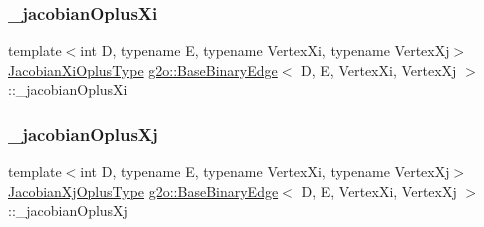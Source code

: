 \mbox{\label{classg2o_1_1_base_binary_edge_aa21b9d84924ec93192374761ee0adfa7}} 
\subsubsection{\texorpdfstring{\+\_\+jacobian\+Oplus\+Xi}{\_jacobianOplusXi}}
{\footnotesize\ttfamily template$<$int D, typename E, typename Vertex\+Xi, typename Vertex\+Xj$>$ \\
\mbox{\hyperlink{classg2o_1_1_base_binary_edge_ab1cde84224b129603bcd95db027e0167}{Jacobian\+Xi\+Oplus\+Type}} \mbox{\hyperlink{classg2o_1_1_base_binary_edge}{g2o\+::\+Base\+Binary\+Edge}}$<$ D, E, Vertex\+Xi, Vertex\+Xj $>$\+::\+\_\+jacobian\+Oplus\+Xi\hspace{0.3cm}{\ttfamily [protected]}}

\mbox{\label{classg2o_1_1_base_binary_edge_ad448518247044496cb99c9d70bd1a363}} 
\subsubsection{\texorpdfstring{\+\_\+jacobian\+Oplus\+Xj}{\_jacobianOplusXj}}
{\footnotesize\ttfamily template$<$int D, typename E, typename Vertex\+Xi, typename Vertex\+Xj$>$ \\
\mbox{\hyperlink{classg2o_1_1_base_binary_edge_a83e5dec2135b33e86255c87be3b5d062}{Jacobian\+Xj\+Oplus\+Type}} \mbox{\hyperlink{classg2o_1_1_base_binary_edge}{g2o\+::\+Base\+Binary\+Edge}}$<$ D, E, Vertex\+Xi, Vertex\+Xj $>$\+::\+\_\+jacobian\+Oplus\+Xj\hspace{0.3cm}{\ttfamily [protected]}}

\mbox{\label{classg2o_1_1_base_binary_edge_abfe232196405a7204bc299a747c1cc8b}} 
